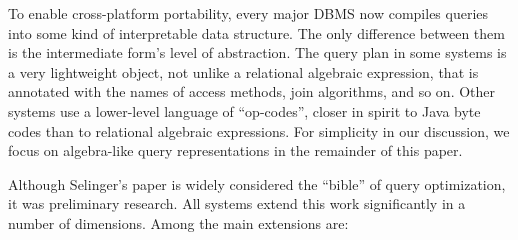 \documentclass[b5paper,11pt,twoside,openright]{book}
\begin{document}
To enable cross-platform portability, every major DBMS now compiles
queries into some kind of interpretable data structure. The only
difference between them is the intermediate form's level of abstraction.
The query plan in some systems is a very lightweight object, not unlike
a relational algebraic expression, that is annotated with the names of
access methods, join algorithms, and so on. Other systems use a
lower-level language of ``op-codes'', closer in spirit to Java byte
codes than to relational algebraic expressions. For simplicity in our
discussion, we focus on algebra-like query representations in the
remainder of this paper.

Although Selinger's paper is widely considered the ``bible'' of query
optimization, it was preliminary research. All systems extend this work
significantly in a number of dimensions. Among the main extensions are:
\end{document}
